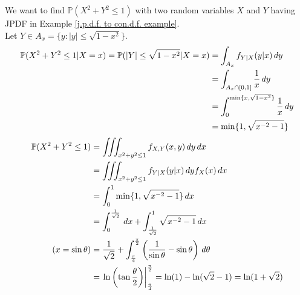 \documentclass{huhtakm-template-book}
\newcommand{\prob}{\mathbb{P}}
\begin{document}
    \begin{eg}
        We want to find $\prob(X^{2}+Y^{2}\leq 1)$ with two random variables $X$ and $Y$ having JPDF in Example \ref{j.p.d.f. to con.d.f. example}.\\
        Let $Y\in A_{x}=\{y:|y|\leq\sqrt{1-x^{2}}\}$.
        \begin{align*}
            \prob(X^{2}+Y^{2}\leq 1|X=x)=\prob(|Y|\leq\sqrt{1-x^{2}}|X=x)&=\int_{A_{x}}f_{Y|X}(y|x)\,dy\\
            &=\int_{A_{x}\cap[0,1]}\frac{1}{x}\,dy\\
            &=\intlu{0}{\min\{x,\sqrt{1-x^{2}}\}}\frac{1}{x}\,dy\\
            &=\min\{1,\sqrt{x^{-2}-1}\}
        \end{align*}
        \begin{align*}
            \prob(X^{2}+Y^{2}\leq 1)&=\iiint_{x^{2}+y^{2}\leq 1}f_{X,Y}(x,y)\,dy\,dx\\
            &=\iiint_{x^{2}+y^{2}\leq 1}f_{Y|X}(y|x)\,dy f_{X}(x)\,dx\\
            &=\intlu{0}{1}\min\{1,\sqrt{x^{-2}-1}\}\,dx\\
            &=\intlu{0}{\frac{1}{\sqrt{2}}}\,dx+\intlu{\frac{1}{\sqrt{2}}}{1}\sqrt{x^{-2}-1}\,dx\\
            \tag{$x=\sin\theta$}
            &=\frac{1}{\sqrt{2}}+\intlu{\frac{\pi}{4}}{\frac{\pi}{2}}\left(\frac{1}{\sin\theta}-\sin\theta\right)\,d\theta\\
            &=\left.\ln\left(\tan\frac{\theta}{2}\right)\right|_{\frac{\pi}{4}}^{\frac{\pi}{2}}=\ln(1)-\ln(\sqrt{2}-1)=\ln(1+\sqrt{2})
        \end{align*}
    \end{eg}
\end{document}
